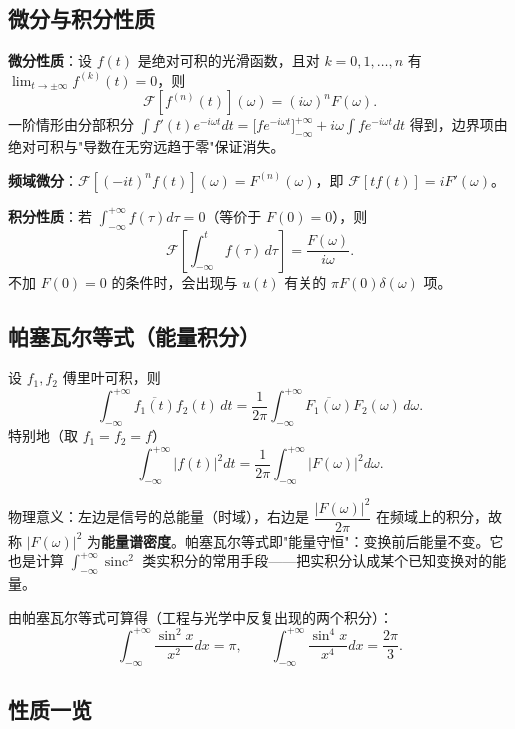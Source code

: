 \subsection{微分与积分性质}

\textbf{微分性质}：设 \(f(t)\) 是绝对可积的光滑函数，且对 \(k=0,1,\dots,n\) 有 \(\lim_{t\to\pm\infty}f^{(k)}(t)=0\)，则
\[
\mathscr{F}\left[f^{(n)}(t)\right](\omega)=(i\omega)^nF(\omega).
\]
一阶情形由分部积分 \(\displaystyle\int f'(t)e^{-i\omega t}dt=\big[f e^{-i\omega t}\big]_{-\infty}^{+\infty}+i\omega\int f e^{-i\omega t}dt\) 得到，边界项由绝对可积与"导数在无穷远趋于零"保证消失。

\textbf{频域微分}：\(\mathscr{F}\left[(-it)^nf(t)\right](\omega)=F^{(n)}(\omega)\)，即 \(\mathscr{F}[tf(t)]=iF'(\omega)\)。

\textbf{积分性质}：若 \(\displaystyle\int_{-\infty}^{+\infty}f(\tau)d\tau=0\)（等价于 \(F(0)=0\)），则
\[
\mathscr{F}\left[\int_{-\infty}^{t}f(\tau)\,d\tau\right]=\frac{F(\omega)}{i\omega}.
\]
不加 \(F(0)=0\) 的条件时，会出现与 \(u(t)\) 有关的 \(\pi F(0)\delta(\omega)\) 项。


\subsection{帕塞瓦尔等式（能量积分）}

设 \(f_1,f_2\) 傅里叶可积，则
\[
\int_{-\infty}^{+\infty}\overline{f_1(t)}f_2(t)\,dt
=\frac{1}{2\pi}\int_{-\infty}^{+\infty}\overline{F_1(\omega)}F_2(\omega)\,d\omega .
\]
特别地（取 \(f_1=f_2=f\)）
\[
\int_{-\infty}^{+\infty}|f(t)|^2dt=\frac{1}{2\pi}\int_{-\infty}^{+\infty}|F(\omega)|^2d\omega .
\]

物理意义：左边是信号的总能量（时域），右边是 \(\dfrac{|F(\omega)|^2}{2\pi}\) 在频域上的积分，故称 \(|F(\omega)|^2\) 为\textbf{能量谱密度}。帕塞瓦尔等式即"能量守恒"：变换前后能量不变。它也是计算 \(\int_{-\infty}^{+\infty}\operatorname{sinc}^2\) 类实积分的常用手段——把实积分认成某个已知变换对的能量。

由帕塞瓦尔等式可算得（工程与光学中反复出现的两个积分）：
\[
\int_{-\infty}^{+\infty}\frac{\sin^2x}{x^2}dx=\pi,
\qquad
\int_{-\infty}^{+\infty}\frac{\sin^4x}{x^4}dx=\frac{2\pi}{3}.
\]

\subsection{性质一览}

